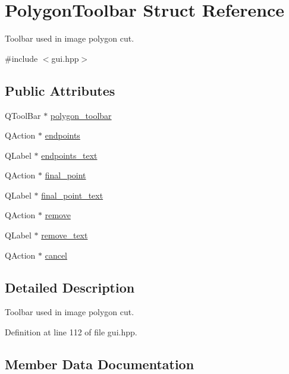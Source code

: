 \hypertarget{structPolygonToolbar}{}\section{Polygon\+Toolbar Struct Reference}
\label{structPolygonToolbar}


Toolbar used in image polygon cut.  




{\ttfamily \#include $<$gui.\+hpp$>$}

\subsection*{Public Attributes}
\begin{DoxyCompactItemize}
\item 
Q\+Tool\+Bar $\ast$ \mbox{\hyperlink{structPolygonToolbar_a5388c77217c5bea7075cf234c508b8d6}{polygon\+\_\+toolbar}}
\item 
Q\+Action $\ast$ \mbox{\hyperlink{structPolygonToolbar_a78a569efc30754e02b7d8f5d74ede0ec}{endpoints}}
\item 
Q\+Label $\ast$ \mbox{\hyperlink{structPolygonToolbar_a4ab3ad9905d894a2f166a4e1cbfb9e3a}{endpoints\+\_\+text}}
\item 
Q\+Action $\ast$ \mbox{\hyperlink{structPolygonToolbar_a25d471a6081bfa4107d5f1cd9a61d243}{final\+\_\+point}}
\item 
Q\+Label $\ast$ \mbox{\hyperlink{structPolygonToolbar_a3af92f094b85ad63be4d9dcf37a88fa8}{final\+\_\+point\+\_\+text}}
\item 
Q\+Action $\ast$ \mbox{\hyperlink{structPolygonToolbar_ad5f83fc2ac8daf17ae3014d05d3f5d5b}{remove}}
\item 
Q\+Label $\ast$ \mbox{\hyperlink{structPolygonToolbar_ad396d8e37e491bb7bfa8bf91d318014c}{remove\+\_\+text}}
\item 
Q\+Action $\ast$ \mbox{\hyperlink{structPolygonToolbar_aea894e742da9051f58af268c43212a22}{cancel}}
\end{DoxyCompactItemize}


\subsection{Detailed Description}
Toolbar used in image polygon cut. 

Definition at line 112 of file gui.\+hpp.



\subsection{Member Data Documentation}
\mbox{\label{structPolygonToolbar_aea894e742da9051f58af268c43212a22}} 
